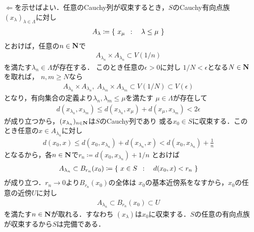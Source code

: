 	\begin{prf}
		$\Longleftarrow$を示せばよい．任意のCauchy列が収束するとき，$S$のCauchy有向点族
		$(x_\lambda)_{\lambda \in \Lambda}$に対し
		\begin{align}
			A_\lambda \coloneqq \left\{\ x_\mu\ \, : \quad \lambda \leq \mu\ \right\}
		\end{align}
		とおけば，任意の$n \in \mathbf{N}$で
		\begin{align}
			A_{\lambda_n} \times A_{\lambda_n} \subset V(1/n)
		\end{align}
		を満たす$\lambda_n \in \Lambda$が存在する．
		このとき任意の$\epsilon > 0$に対し
		$1/N < \epsilon$となる$N \in \mathbf{N}$を取れば，
		$n,m \geq N$なら
		\begin{align}
			A_{\lambda_n} \times A_{\lambda_n},\
			A_{\lambda_m} \times A_{\lambda_m}
			\subset V(1/N) \subset V(\epsilon)
		\end{align}
		となり，有向集合の定義より$\lambda_n,\lambda_m \leq \mu$を満たす
		$\mu \in \Lambda$が存在して
		\begin{align}
			d(x_{\lambda_n},x_{\lambda_m})
			\leq d(x_{\lambda_n},x_\mu) + d(x_\mu,x_{\lambda_m})
			< 2\epsilon
		\end{align}
		が成り立つから，$(x_{\lambda_n})_{n \in \mathbf{N}}$は$S$のCauchy列であり
		或る$x_0 \in S$に収束する．このとき任意の$x \in A_{\lambda_n}$に対し
		\begin{align}
			d(x_0,x) \leq d(x_0,x_{\lambda_n}) + d(x_{\lambda_n},x)
			< d(x_0,x_{\lambda_n}) + \frac{1}{n}
		\end{align}
		となるから，各$n \in \mathbf{N}$で$r_n \coloneqq d(x_0,x_{\lambda_n}) + 1/n$
		とおけば
		\begin{align}
			A_{\lambda_n} \subset B_{r_n}(x_0)
			\coloneqq \left\{\ x \in S\ \, : \quad d(x_0,x) < r_n\ \right\}
		\end{align}
		が成り立つ．$r_n \longrightarrow 0$より$B_{r_n}(x_0)$の全体は
		$x_0$の基本近傍系をなすから，$x_0$の任意の近傍$U$に対し
		\begin{align}
			A_{\lambda_n} \subset B_{r_n}(x_0) \subset U
		\end{align}
		を満たす$n \in \mathbf{N}$が取れる．すなわち
		$(x_\lambda)$は$x_0$に収束する．$S$の任意の有向点族が収束するから$S$は完備である．
		\QED
	\end{prf}